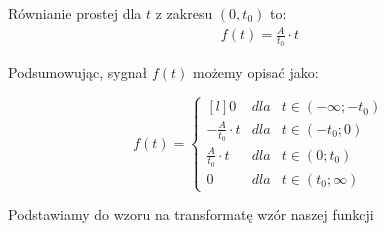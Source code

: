 \begin{task}
Równianie prostej dla $t$ z zakresu  $(0,t_{0})$ to:
\begin{align*}
f(t) = \frac{A}{t_{0}}\cdot t
\end{align*}

Podsumowując, sygnał $f(t)$ możemy opisać jako:

\begin{equation}
f(t) = \left\{\begin{matrix*}[l]
0 & dla & t \in \left(-\infty; -t_{0}\right)\\
-\frac{A}{t_{0}} \cdot t  & dla & t \in \left(-t_{0}; 0\right)\\
\frac{A}{t_{0}} \cdot t & dla & t \in \left(0; t_{0}\right)\\
0 & dla & t \in \left(t_{0};\infty\right)
\end{matrix*}\right.
\end{equation}

Podstawiamy do wzoru na transformatę wzór naszej funkcji


\end{task}
